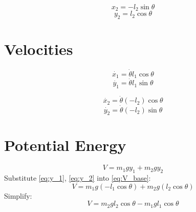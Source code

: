 \documentclass[titlepage]{article}
\numberwithin{equation}{section}
\begin{document}
\begin{equation}
x_2 = -l_2 \sin \theta
\end{equation}
\begin{equation} \label{eq:y_2}
y_2 = l_2 \cos \theta
\end{equation}

\section{Velocities}
\begin{equation} \label{eq:x_1_dot}
\dot{x_1} = \dot{\theta} l_1 \cos \theta
\end{equation}
\begin{equation} \label{eq:y_1_dot}
\dot{y_1} = \dot{\theta} l_1 \sin \theta
\end{equation}

\begin{equation} \label{eq:x_2_dot}
\dot{x_2} = \dot{\theta} (-l_2) \cos \theta
\end{equation}
\begin{equation} \label{eq:y_2_dot}
\dot{y_2} = \dot{\theta} (-l_2) \sin \theta
\end{equation}

\section{Potential Energy}
\begin{equation} \label{eq:V_base}
V = m_1 g y_1 + m_2 g y_2
\end{equation}
Substitute \ref{eq:y_1}, \ref{eq:y_2} into \ref{eq:V_base}:
\begin{equation}
V = m_1 g (-l_1 \cos \theta) + m_2 g (l_2 \cos \theta)
\end{equation}
Simplify:
\begin{equation} \label{eq:V}
V = m_2 g l_2 \cos \theta - m_1 g l_1 \cos \theta
\end{equation}
\end{document}
